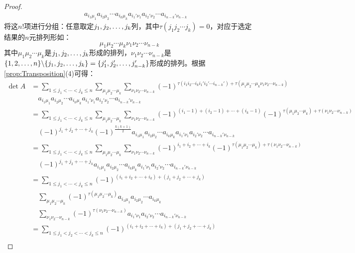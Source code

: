\begin{proof}
\begin{align*}
		&\quad a_{i_1\mu_1}a_{i_2\mu_2}\cdots a_{i_k\mu_k}a_{i_1'\nu_1}a_{i_2'\nu_2}\cdots a_{i_{n-k}'\nu_{n-k}}
	\end{align*}
	将这$n!$项进行分组：任意取定$j_1, j_2, \dots, j_{k}$列，其中$\tau(j_1j_2\cdots j_k)=0$，对应于选定结果的$n$元排列形如：
	\begin{equation*}
		\mu_1\mu_2\cdots\mu_k\nu_1\nu_2\cdots\nu_{n-k}
	\end{equation*}
	其中$\mu_1\mu_2\cdots\mu_k$是$j_1, j_2, \dots, j_{k}$形成的排列，$\nu_1\nu_2\cdots\nu_{n-k}$是$\{1,2,\dots,n\}\backslash\{j_1, j_2, \dots, j_{k}\}=\{j_1',j_2',\dots,j_{n-k}'\}$形成的排列。根据\cref{prop:Transposition}(4)可得：
	\begin{align*}
		\det A&=\sum_{1\leqslant j_1<\cdots<j_k\leqslant n}^{}\sum_{\mu_1\mu_2\cdots\mu_k}^{}\sum_{\nu_1\nu_2\cdots\nu_{n-k}}^{}(-1)^{\tau(i_1i_2\cdots i_ki_1'i_2'\cdots i_{n-k}')+\tau(\mu_1\mu_2\cdots\mu_k\nu_1\nu_2\cdots\nu_{n-k})} \\
		&\quad a_{i_1\mu_1}a_{i_2\mu_2}\cdots a_{i_k\mu_k}a_{i_1'\nu_1}a_{i_2'\nu_2}\cdots a_{i_{n-k}'\nu_{n-k}} \\
		&=\sum_{1\leqslant j_1<\cdots<j_k\leqslant n}^{}\sum_{\mu_1\mu_2\cdots\mu_k}^{}\sum_{\nu_1\nu_2\cdots\nu_{n-k}}^{}(-1)^{(i_1-1)+(i_2-1)+\cdots+(i_{k}-1)}(-1)^{\tau(\mu_1\mu_2\cdots\mu_k)+\tau(\nu_1\nu_2\cdots\nu_{n-k})} \\
		&\quad(-1)^{j_1+j_2+\cdots+j_k}(-1)^{\frac{k(k+1)}{2}}a_{i_1\mu_1}a_{i_2\mu_2}\cdots a_{i_k\mu_k}a_{i_1'\nu_1}a_{i_2'\nu_2}\cdots a_{i_{n-k}'\nu_{n-k}} \\
		&=\sum_{1\leqslant j_1<\cdots<j_k\leqslant n}^{}\sum_{\mu_1\mu_2\cdots\mu_k}^{}\sum_{\nu_1\nu_2\cdots\nu_{n-k}}^{}(-1)^{i_1+i_2+\cdots+i_k}(-1)^{\tau(\mu_1\mu_2\cdots\mu_k)+\tau(\nu_1\nu_2\cdots\nu_{n-k})} \\
		&\quad(-1)^{j_1+j_2+\cdots+j_k}a_{i_1\mu_1}a_{i_2\mu_2}\cdots a_{i_k\mu_k}a_{i_1'\nu_1}a_{i_2'\nu_2}\cdots a_{i_{n-k}'\nu_{n-k}} \\
		&=\sum_{1\leqslant j_1<\cdots<j_k\leqslant n}^{}(-1)^{(i_1+i_2+\cdots+i_k)+(j_1+j_2+\cdots+j_k)} \\
		&\quad\sum_{\mu_1\mu_2\cdots\mu_k}^{}(-1)^{\tau(\mu_1\mu_2\cdots\mu_k)}a_{i_1\mu_1}a_{i_2\mu_2}\cdots a_{i_k\mu_k} \\
		&\quad\sum_{\nu_1\nu_2\cdots\nu_{n-k}}^{}(-1)^{\tau(\nu_1\nu_2\cdots\nu_{n-k})}a_{i_1'\nu_1}a_{i_2'\nu_2}\cdots a_{i_{n-k}'\nu_{n-k}} \\
		&=\sum_{1\leqslant j_1<j_2<\cdots<j_k\leqslant n}(-1)^{(i_1+i_2+\cdots+i_k)+(j_1+j_2+\cdots+j_k)} \\

\end{align*}
\end{proof}
